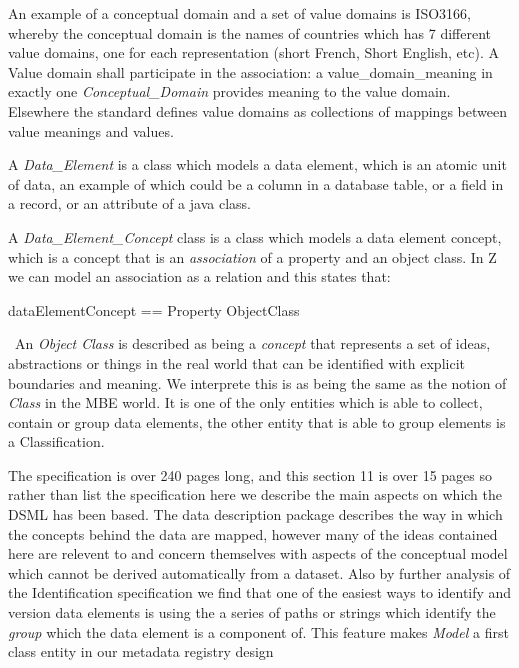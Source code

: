 \documentclass{llncs}
\begin{document}
An example of a conceptual domain and a set of value domains is ISO3166, whereby the conceptual domain is the names of countries which has 7 different value domains, one for each representation (short French, Short English, etc).  A Value domain shall participate in the association: a value\_domain\_meaning in exactly one \emph{Conceptual\_Domain} provides meaning to the value domain. Elsewhere the standard defines value domains as collections of mappings between value meanings and values.

A \emph{Data\_Element} is a class which models a data element, which is an atomic unit of data, an example of which could be a column in a database table, or a field in a record, or an attribute of a java class.



A \emph{Data\_Element\_Concept} class is a class which models a data element concept, which is a concept that is an \emph{association} of a property and an object class. In Z we can model an association as a relation and this states that:

\begin{zed}
dataElementConcept == Property \pfun ObjectClass\\
\end{zed}
\
An \emph{Object Class} is described as being a \emph{concept} that represents a set of ideas, abstractions or things in the real world that can be identified with explicit boundaries and meaning. We interprete this is as being the same as the notion of \emph{Class} in the MBE world. It is one of the only entities which is able to collect, contain or group data elements, the other entity that is able to group elements is a Classification.

The specification is over 240 pages long, and this section 11 is over 15 pages so rather than list the specification here we describe the main aspects on which the DSML has been based. The data description package describes the way in which the concepts behind the data are mapped, however many of the ideas contained here are relevent to and concern themselves with aspects of the conceptual model which cannot be derived automatically from a dataset.   Also by further analysis of the Identification specification we find that one of the easiest ways to identify and version data elements is using the a series of paths or strings which identify the \emph{group} which the data element is a component of. This feature makes \emph{Model} a first class entity in our metadata registry design
\end{document}
